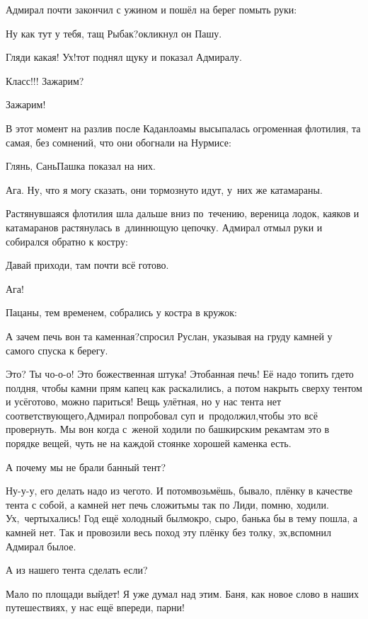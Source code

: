 Адмирал почти закончил с ужином и пошёл на берег помыть руки:

\diagdash Ну как тут у тебя, тащ Рыбак?\mdash окликнул он Пашу.

\diagdash Гляди какая! Ух!\mdash тот поднял щуку и показал Адмиралу.

\diagdash Класс!!! Зажарим?

\diagdash Зажарим!

В этот момент на разлив после Каданлоамы высыпалась огроменная флотилия, та самая, без сомнений, что они обогнали на Нурмисе:

\diagdash Глянь, Сань\mdash Пашка показал на них.

\diagdash Ага. Ну, что я могу сказать, они тормознуто идут, у~них же катамараны.

Растянувшаяся флотилия шла дальше вниз по~течению, вереница лодок, каяков и катамаранов растянулась в~длиннющую цепочку. Адмирал отмыл руки и собирался обратно к костру:

\diagdash Давай приходи, там почти всё готово.

\diagdash Ага!

Пацаны, тем временем, собрались у костра в кружок:

\diagdash А зачем печь вон та каменная?\mdash спросил Руслан, указывая на груду камней у самого спуска к берегу.

\diagdash Это? Ты чо-о-о! Это божественная штука! Это\mdash банная печь! Её надо топить где\sdash то полдня, чтобы камни прям капец как раскалились, а потом накрыть сверху тентом и усё\mdash готово, можно париться! Вещь улётная, но у нас тента нет соответствующего,\mdash Адмирал попробовал суп и~продолжил,\mdash чтобы это всё провернуть. Мы вон когда с~женой ходили по башкирским рекам\mdash там это в порядке вещей, чуть не на каждой стоянке хорошей каменка есть.

\diagdash А почему мы не брали банный тент?

\diagdash Ну-у-у, его делать надо из чего\sdash то. И потом\mdash возьмёшь, бывало, плёнку в качестве тента с собой, а камней нет печь сложить\mdash мы так по Лиди, помню, ходили. Ух,~чертыхались! Год ещё холодный был\mdash мокро, сыро, банька бы в тему пошла, а камней нет. Так и провозили весь поход эту плёнку без толку, эх,\mdash вспомнил Адмирал былое.

\diagdash А из нашего тента сделать если?

\diagdash Мало по площади выйдет! Я уже думал над этим. Баня, как новое слово в наших путешествиях, у нас ещё впереди, парни!

